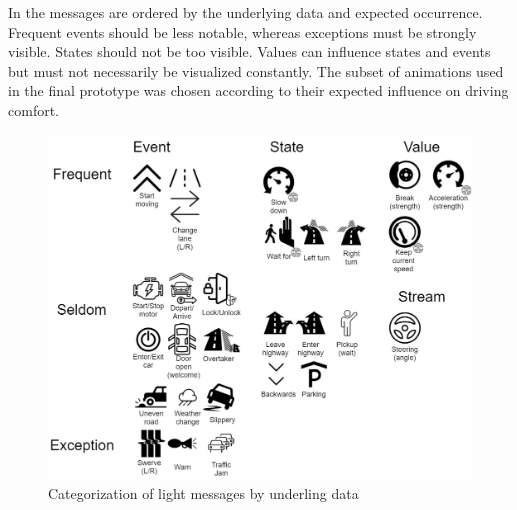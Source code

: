  In \emph{\emph{}} the messages are ordered by the underlying data and expected occurrence. Frequent events should be less notable, whereas exceptions must be strongly visible. States should not be too visible. Values can influence states and events but must not necessarily be visualized constantly. The subset of animations used in the final prototype was chosen according to their expected influence on driving comfort. 
 
\begin{figure}
    \includegraphics[height=\textwidth]{fig/tab-}
    \caption[Light Events]{Categorization of light messages by underling data}
    \label{fig:lightevents}
\end{figure}

